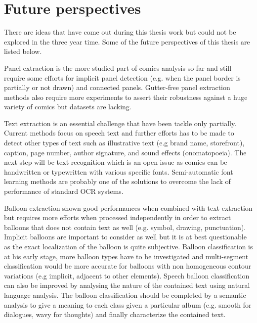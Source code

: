 \section{Future perspectives}
\label{conclusions:perspectives}

There are ideas that have come out during this thesis work but could not be explored in the three year time.
Some of the future perspectives of this thesis are listed below.

Panel extraction is the more studied part of comics analysis so far and still require some efforts for implicit panel detection (e.g. when the panel border is partially or not drawn) and connected panels.
Gutter-free panel extraction methods also require more experiments to assert their robustness against a huge variety of comics but datasets are lacking.

Text extraction is an essential challenge that have been tackle only partially.
Current methods focus on speech text and further efforts has to be made to detect other types of text such as illustrative text (e.g brand name, storefront), caption, page number, author signature, and sound effects (onomatopoeia).
The next step will be text recognition which is an open issue as comics can be handwritten or typewritten with various specific fonts.
Semi-automatic font learning methods are probably one of the solutions to overcome the lack of performance of standard OCR systems. 

Balloon extraction shown good performances when combined with text extraction but requires more efforts when processed independently in order to extract balloons that does not contain text as well (e.g. symbol, drawing, punctuation).
Implicit balloons are important to consider as well but it is at best questionable as the exact localization of the balloon is quite subjective.
Balloon classification is at his early stage, more balloon types have to be investigated and multi-segment classification would be more accurate for balloons with non homogeneous contour variations (e.g implicit, adjacent to other elements). 
Speech balloon classification can also be improved by analysing the nature of the contained text using natural language analysis.
The balloon classification should be completed by a semantic analysis to give a meaning to each class given a particular album (e.g. smooth for dialogues, wavy for thoughts) and finally characterize the contained text.

